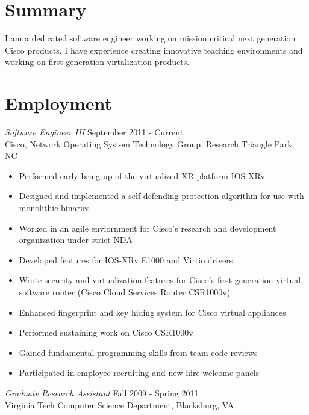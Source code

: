 \documentclass[line,margin]{res}
\begin{document}
\address{}
\address{Email: vtwoods@gmail.com --- Cell: }

 
\begin{resume}

\section{Summary} I am a dedicated software engineer working on mission critical next generation Cisco products.  I have experience creating innovative teaching environments and working on first generation virtalization products.

\section{Employment}
        {\sl Software Engineer III} \hfill September 2011 - Current \\
        Cisco, Network Operating System Technology Group, Research Triangle Park, NC
        \begin{itemize}  \itemsep -2pt %
             \item Performed early bring up of the virtualized XR platform IOS-XRv
             \item Designed and implemented a self defending protection algorithm for use with monolithic binaries
             \item Worked in an agile enviornment for Cisco's research and development organization under strict NDA
             \item Developed features for IOS-XRv E1000 and Virtio drivers
             \item Wrote security and virtualization features for Cisco's first generation virtual software router (Cisco Cloud Services Router CSR1000v)  
             \item Enhanced fingerprint and key hiding system for Cisco virtual appliances
             \item Performed sustaining work on Cisco CSR1000v
             \item Gained fundamental programming skills from team code reviews
             \item Participated in employee recruiting and new hire welcome panels
        \end{itemize}
        {\sl Graduate Research Assistant} \hfill  Fall 2009 - Spring 2011 \\
        Virginia Tech Computer Science Department, Blacksburg, VA

\end{resume}
\end{document}
